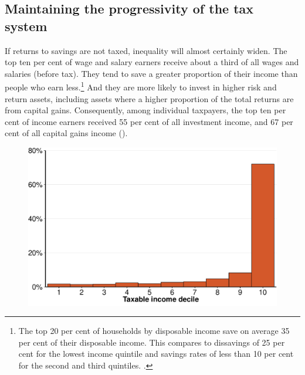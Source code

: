 \documentclass{grattanAlpha}\usepackage[]{graphicx}\usepackage[]{color}
\begin{document}
\subsection{Maintaining the progressivity of the tax system}\label{subsec:maintaining-progressivity-tax-system}
If returns to savings are not taxed, inequality will almost certainly widen. The top ten per cent of wage and salary earners receive about a third of all wages and salaries (before tax). They tend to save a greater proportion of their income than people who earn less.\footnote{The top 20 per cent of households by disposable income save on average 35 per cent of their disposable income. This compares to dissavings of 25 per cent for the lowest income quintile and savings rates of less than 10 per cent for the second and third quintiles. \textcite[][table~5]{ABS2014DistributionHouseholdIncome}.} And they are more likely to invest in higher risk and return assets, including assets where a higher proportion of the total returns are from capital gains. Consequently, among individual taxpayers, the top ten per cent of income earners received 55 per cent of all investment income, and 67 per cent of all capital gains income (). 

\begin{figure}[!ht]
\label{fig:CG-by-decile}

\includegraphics[width=\columnwidth]{CGT-NG-atlas//CG-by-decile-1}
\end{figure}
\end{document}
